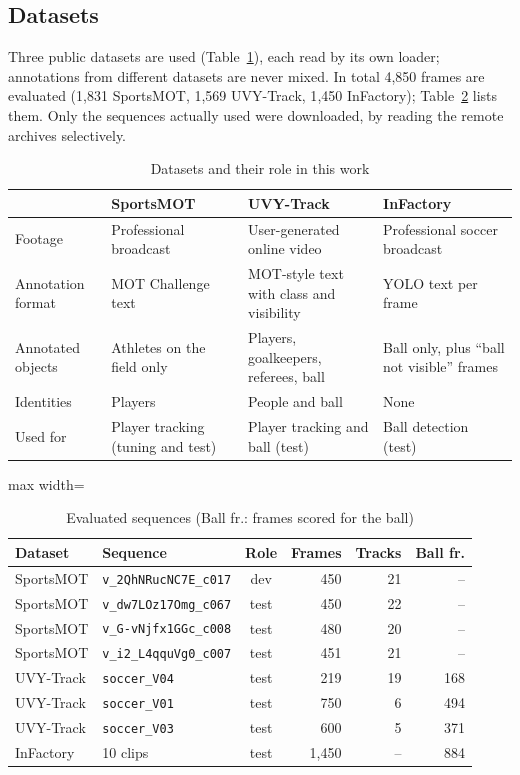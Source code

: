 \documentclass[conference]{IEEEtran}
\begin{document}
\subsection{Datasets}
\label{sec:datasets}
Three public datasets are used (Table~\ref{tab:datasets}), each read by its own
loader; annotations from different datasets are never mixed. In total
4{,}850 frames are evaluated (1{,}831 SportsMOT, 1{,}569
UVY-Track, 1{,}450 InFactory); Table~\ref{tab:sequences} lists them. Only
the sequences actually used were downloaded, by reading the remote archives
selectively.

\begin{table}[!t]
\caption{Datasets and their role in this work}
\label{tab:datasets}
\centering
\footnotesize
\begin{tabular}{@{}p{2.5cm}p{4.3cm}p{5.0cm}p{4.4cm}@{}}
\toprule
 & SportsMOT~\cite{sportsmot} & UVY-Track~\cite{uvy} & InFactory~\cite{infactory} \\
\midrule
Footage & Professional broadcast & User-generated online video & Professional soccer broadcast \\
Annotation format & MOT Challenge text & MOT-style text with class and visibility & YOLO text per frame \\
Annotated objects & Athletes on the field only & Players, goalkeepers, referees, ball & Ball only, plus ``ball not visible'' frames \\
Identities & Players & People and ball & None \\
Used for & Player tracking (tuning and test) & Player tracking and ball (test) & Ball detection (test) \\
\bottomrule
\end{tabular}
\end{table}

\begin{table}[!htb]
\caption{Evaluated sequences (Ball fr.: frames scored for the ball)}
\label{tab:sequences}
\centering
\footnotesize
\begin{adjustbox}{max width=\columnwidth}
\begin{tabular}{@{}llcrrr@{}}
\toprule
Dataset & Sequence & Role & Frames & Tracks & Ball fr. \\
\midrule
SportsMOT & \texttt{v\_2QhNRucNC7E\_c017} & dev & 450 & 21 & -- \\
SportsMOT & \texttt{v\_dw7LOz17Omg\_c067} & test & 450 & 22 & -- \\
SportsMOT & \texttt{v\_G-vNjfx1GGc\_c008} & test & 480 & 20 & -- \\
SportsMOT & \texttt{v\_i2\_L4qquVg0\_c007} & test & 451 & 21 & -- \\
UVY-Track & \texttt{soccer\_V04} & test & 219 & 19 & 168 \\
UVY-Track & \texttt{soccer\_V01} & test & 750 & 6 & 494 \\
UVY-Track & \texttt{soccer\_V03} & test & 600 & 5 & 371 \\
InFactory & 10 clips & test & 1{,}450 & -- & 884 \\
\bottomrule
\end{tabular}
\end{adjustbox}
\end{table}
\end{document}
